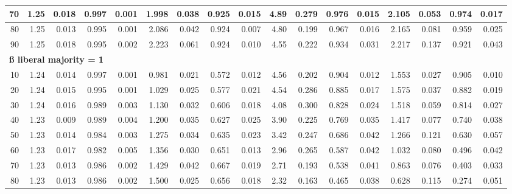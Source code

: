 \documentclass[
]{article}
\begin{document}
\begin{table}[H]
{\begin{tabular}{r|r|r|r|r|r|r|r|r|r|r|r|r|r|r|r|r}
\hline
\hspace{1em}70 & 1.25 & 0.018 & 0.997 & 0.001 & 1.998 & 0.038 & 0.925 & 0.015 & 4.89 & 0.279 & 0.976 & 0.015 & 2.105 & 0.053 & 0.974 & 0.017\\
\hline
\hspace{1em}80 & 1.25 & 0.013 & 0.995 & 0.001 & 2.086 & 0.042 & 0.924 & 0.007 & 4.80 & 0.199 & 0.967 & 0.016 & 2.165 & 0.081 & 0.959 & 0.025\\
\hline
\hspace{1em}90 & 1.25 & 0.018 & 0.995 & 0.002 & 2.223 & 0.061 & 0.924 & 0.010 & 4.55 & 0.222 & 0.934 & 0.031 & 2.217 & 0.137 & 0.921 & 0.043\\
\hline
\multicolumn{17}{l}{\textbf{ß liberal majority = 1}}\\
\hline
\hspace{1em}10 & 1.24 & 0.014 & 0.997 & 0.001 & 0.981 & 0.021 & 0.572 & 0.012 & 4.56 & 0.202 & 0.904 & 0.012 & 1.553 & 0.027 & 0.905 & 0.010\\
\hline
\hspace{1em}20 & 1.24 & 0.015 & 0.995 & 0.001 & 1.029 & 0.025 & 0.577 & 0.021 & 4.54 & 0.286 & 0.885 & 0.017 & 1.575 & 0.037 & 0.882 & 0.019\\
\hline
\hspace{1em}30 & 1.24 & 0.016 & 0.989 & 0.003 & 1.130 & 0.032 & 0.606 & 0.018 & 4.08 & 0.300 & 0.828 & 0.024 & 1.518 & 0.059 & 0.814 & 0.027\\
\hline
\hspace{1em}40 & 1.23 & 0.009 & 0.989 & 0.004 & 1.200 & 0.035 & 0.627 & 0.025 & 3.90 & 0.225 & 0.769 & 0.035 & 1.417 & 0.077 & 0.740 & 0.038\\
\hline
\hspace{1em}50 & 1.23 & 0.014 & 0.984 & 0.003 & 1.275 & 0.034 & 0.635 & 0.023 & 3.42 & 0.247 & 0.686 & 0.042 & 1.266 & 0.121 & 0.630 & 0.057\\
\hline
\hspace{1em}60 & 1.23 & 0.017 & 0.982 & 0.005 & 1.356 & 0.030 & 0.651 & 0.013 & 2.96 & 0.265 & 0.587 & 0.042 & 1.032 & 0.080 & 0.496 & 0.042\\
\hline
\hspace{1em}70 & 1.23 & 0.013 & 0.986 & 0.002 & 1.429 & 0.042 & 0.667 & 0.019 & 2.71 & 0.193 & 0.538 & 0.041 & 0.863 & 0.076 & 0.403 & 0.033\\
\hline
\hspace{1em}80 & 1.23 & 0.013 & 0.986 & 0.002 & 1.500 & 0.025 & 0.656 & 0.018 & 2.32 & 0.163 & 0.465 & 0.038 & 0.628 & 0.115 & 0.274 & 0.051\\

\end{tabular}}
\end{table}
\end{document}
